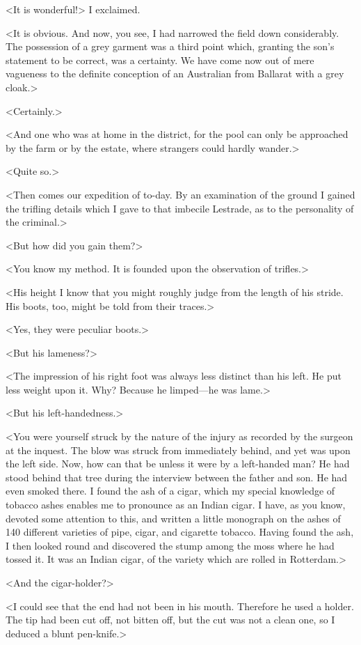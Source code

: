 <It is wonderful!> I exclaimed.

<It is obvious. And now, you see, I had narrowed the field down considerably. The possession of a grey garment was a third point which, granting the son's statement to be correct, was a certainty. We have come now out of mere vagueness to the definite conception of an Australian from Ballarat with a grey cloak.>

<Certainly.>

<And one who was at home in the district, for the pool can only be approached by the farm or by the estate, where strangers could hardly wander.>

<Quite so.>

<Then comes our expedition of to-day. By an examination of the ground I gained the trifling details which I gave to that imbecile Lestrade, as to the personality of the criminal.>

<But how did you gain them?>

<You know my method. It is founded upon the observation of trifles.>

<His height I know that you might roughly judge from the length of his stride. His boots, too, might be told from their traces.>

<Yes, they were peculiar boots.>

<But his lameness?>

<The impression of his right foot was always less distinct than his left. He put less weight upon it. Why? Because he limped—he was lame.>

<But his left-handedness.>

<You were yourself struck by the nature of the injury as recorded by the surgeon at the inquest. The blow was struck from immediately behind, and yet was upon the left side. Now, how can that be unless it were by a left-handed man? He had stood behind that tree during the interview between the father and son. He had even smoked there. I found the ash of a cigar, which my special knowledge of tobacco ashes enables me to pronounce as an Indian cigar. I have, as you know, devoted some attention to this, and written a little monograph on the ashes of 140 different varieties of pipe, cigar, and cigarette tobacco. Having found the ash, I then looked round and discovered the stump among the moss where he had tossed it. It was an Indian cigar, of the variety which are rolled in Rotterdam.>

<And the cigar-holder?>

<I could see that the end had not been in his mouth. Therefore he used a holder. The tip had been cut off, not bitten off, but the cut was not a clean one, so I deduced a blunt pen-knife.>

